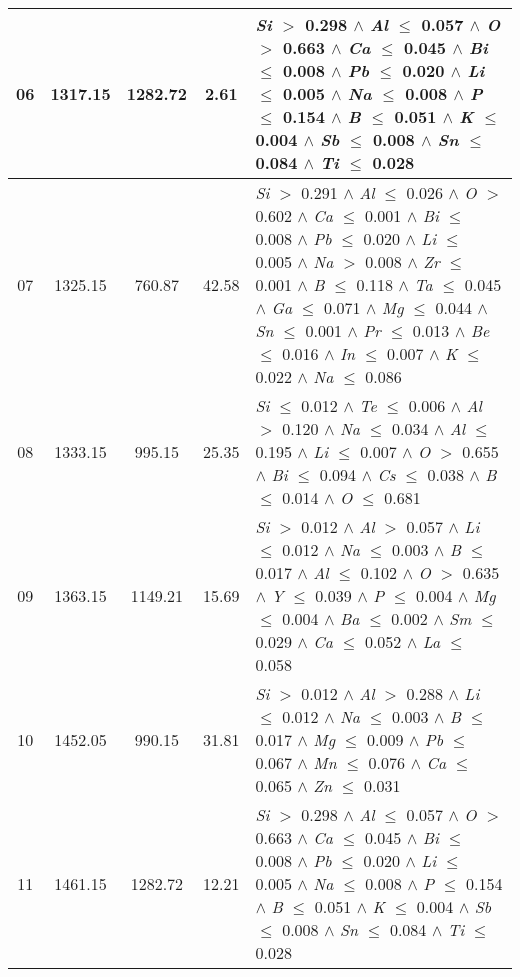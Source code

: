 \documentclass{article}
\begin{document}
\begin{table}[!htbp]
\begin{tabular}{ccccm{}}
		\hline
		06 & 1317.15 & 1282.72 & 2.61 & \textit{Si} $>$ 0.298 $\wedge$ \textit{Al} $\le$ 0.057 $\wedge$ \textit{O} $>$ 0.663 $\wedge$ \textit{Ca} $\le$ 0.045 $\wedge$ \textit{Bi} $\le$ 0.008 $\wedge$ \textit{Pb} $\le$ 0.020 $\wedge$ \textit{Li} $\le$ 0.005 $\wedge$ \textit{Na} $\le$ 0.008 $\wedge$ \textit{P} $\le$ 0.154 $\wedge$ \textit{B} $\le$ 0.051 $\wedge$ \textit{K} $\le$ 0.004 $\wedge$ \textit{Sb} $\le$ 0.008 $\wedge$ \textit{Sn} $\le$ 0.084 $\wedge$ \textit{Ti} $\le$ 0.028\\
		\hline
		07 & 1325.15 & 760.87 & 42.58 & \textit{Si} $>$ 0.291 $\wedge$ \textit{Al} $\le$ 0.026 $\wedge$ \textit{O} $>$ 0.602 $\wedge$ \textit{Ca} $\le$ 0.001 $\wedge$ \textit{Bi} $\le$ 0.008 $\wedge$ \textit{Pb} $\le$ 0.020 $\wedge$ \textit{Li} $\le$ 0.005 $\wedge$ \textit{Na} $>$ 0.008 $\wedge$ \textit{Zr} $\le$ 0.001 $\wedge$ \textit{B} $\le$ 0.118 $\wedge$ \textit{Ta} $\le$ 0.045 $\wedge$ \textit{Ga} $\le$ 0.071 $\wedge$ \textit{Mg} $\le$ 0.044 $\wedge$ \textit{Sn} $\le$ 0.001 $\wedge$ \textit{Pr} $\le$ 0.013 $\wedge$ \textit{Be} $\le$ 0.016 $\wedge$ \textit{In} $\le$ 0.007 $\wedge$ \textit{K} $\le$ 0.022 $\wedge$ \textit{Na} $\le$ 0.086\\
		\hline
		08 & 1333.15 & 995.15 & 25.35 & \textit{Si} $\le$ 0.012 $\wedge$ \textit{Te} $\le$ 0.006 $\wedge$ \textit{Al} $>$ 0.120 $\wedge$ \textit{Na} $\le$ 0.034 $\wedge$ \textit{Al} $\le$ 0.195 $\wedge$ \textit{Li} $\le$ 0.007 $\wedge$ \textit{O} $>$ 0.655 $\wedge$ \textit{Bi} $\le$ 0.094 $\wedge$ \textit{Cs} $\le$ 0.038 $\wedge$ \textit{B} $\le$ 0.014 $\wedge$ \textit{O} $\le$ 0.681\\
		\hline
		09 & 1363.15 & 1149.21 & 15.69 & \textit{Si} $>$ 0.012 $\wedge$ \textit{Al} $>$ 0.057 $\wedge$ \textit{Li} $\le$ 0.012 $\wedge$ \textit{Na} $\le$ 0.003 $\wedge$ \textit{B} $\le$ 0.017 $\wedge$ \textit{Al} $\le$ 0.102 $\wedge$ \textit{O} $>$ 0.635 $\wedge$ \textit{Y} $\le$ 0.039 $\wedge$ \textit{P} $\le$ 0.004 $\wedge$ \textit{Mg} $\le$ 0.004 $\wedge$ \textit{Ba} $\le$ 0.002 $\wedge$ \textit{Sm} $\le$ 0.029 $\wedge$ \textit{Ca} $\le$ 0.052 $\wedge$ \textit{La} $\le$ 0.058\\
		\hline
		10 & 1452.05 & 990.15 & 31.81 & \textit{Si} $>$ 0.012 $\wedge$ \textit{Al} $>$ 0.288 $\wedge$ \textit{Li} $\le$ 0.012 $\wedge$ \textit{Na} $\le$ 0.003 $\wedge$ \textit{B} $\le$ 0.017 $\wedge$ \textit{Mg} $\le$ 0.009 $\wedge$ \textit{Pb} $\le$ 0.067 $\wedge$ \textit{Mn} $\le$ 0.076 $\wedge$ \textit{Ca} $\le$ 0.065 $\wedge$ \textit{Zn} $\le$ 0.031\\
		\hline
		11 & 1461.15 & 1282.72 & 12.21 & \textit{Si} $>$ 0.298 $\wedge$ \textit{Al} $\le$ 0.057 $\wedge$ \textit{O} $>$ 0.663 $\wedge$ \textit{Ca} $\le$ 0.045 $\wedge$ \textit{Bi} $\le$ 0.008 $\wedge$ \textit{Pb} $\le$ 0.020 $\wedge$ \textit{Li} $\le$ 0.005 $\wedge$ \textit{Na} $\le$ 0.008 $\wedge$ \textit{P} $\le$ 0.154 $\wedge$ \textit{B} $\le$ 0.051 $\wedge$ \textit{K} $\le$ 0.004 $\wedge$ \textit{Sb} $\le$ 0.008 $\wedge$ \textit{Sn} $\le$ 0.084 $\wedge$ \textit{Ti} $\le$ 0.028\\
		\bottomrule
	\end{tabular}
\end{table}
\end{document}
